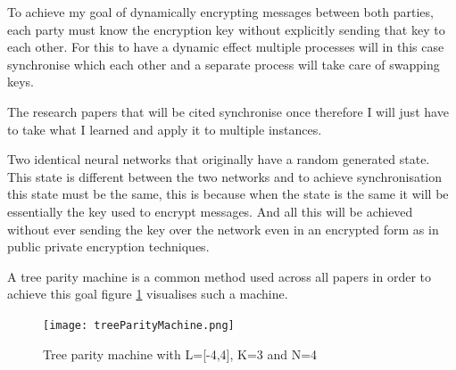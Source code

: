 
%
%
%
%

%
%
%
%
To achieve my goal of dynamically encrypting messages between both parties, each party must know the encryption key without explicitly sending that key to each other. For this to have a dynamic effect multiple processes will in this case synchronise which each other and a separate process will take care of swapping keys.

The research papers that will be cited synchronise once therefore I will just have to take what I learned and apply it to multiple instances.

Two identical neural networks that originally have a random generated state. This state is different between the two networks and to achieve synchronisation this state must be the same, this is because when the state is the same it will be essentially the key used to encrypt messages. And all this will be achieved without ever sending the key over the network even in an encrypted form as in public private encryption techniques. 

A tree parity machine is a common method used across all papers in order to achieve this goal figure \ref{fig:treeParityMachine} visualises such a machine.

\begin{figure}[ht]
  \centering
      \texttt{[image: treeParityMachine.png]}
  \caption[Tree parity machine]{Tree parity machine with L=[-4,4], K=3 and N=4\cite{Private_Inputs_to_Tree_Parity_Machine}}
  \label{fig:treeParityMachine}
\end{figure}


